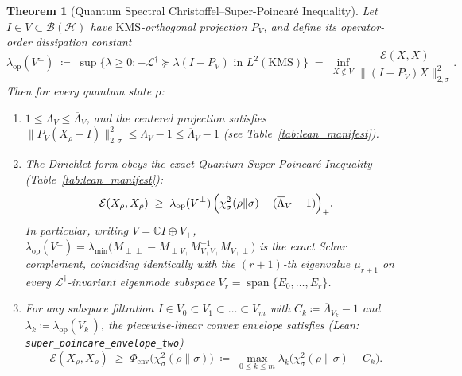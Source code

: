 \documentclass[11pt,a4paper]{article}
\newtheorem{theorem}{Theorem}[section]
\theoremstyle{definition}
\newcommand{\C}{\mathbb{C}}
\newcommand{\Edir}{\mathcal{E}}
\newcommand{\KMS}{\mathrm{KMS}}
\begin{document}
\begin{theorem}[Quantum Spectral Christoffel--Super-Poincar\'e Inequality]
\label{thm:christoffel_sp}
Let $I \in V \subset \mathcal{B}(\mathcal{H})$ have $\KMS$-orthogonal projection $P_V$, and define its \emph{operator-order dissipation constant}
\[
  \lambda_{\mathrm{op}}(V^\perp) \;\coloneqq\;
  \sup\bigl\{\lambda \ge 0 : -\mathcal{L}^\dagger \succeq \lambda(I - P_V) \text{ in } L^2(\KMS)\bigr\}
  \;=\; \inf_{X \notin V} \frac{\Edir(X, X)}{\|(I - P_V) X\|_{2,\sigma}^2}.
\]
Then for \emph{every} quantum state $\rho$:
\begin{enumerate}[label=(\alph*),leftmargin=2em,itemsep=2pt]
  \item $1 \le \Lambda_V \le \overline{\Lambda}_V$, and the centered projection satisfies $\|P_V(X_\rho - I)\|_{2,\sigma}^2 \le \Lambda_V - 1 \le \overline{\Lambda}_V - 1$ (see Table~\ref{tab:lean_manifest}).
  \item The Dirichlet form obeys the exact Quantum Super-Poincar\'e Inequality (Table~\ref{tab:lean_manifest}):
  \begin{equation}
    \Edir(X_\rho, X_\rho) \;\ge\; \lambda_{\mathrm{op}}(V^\perp)\,\Bigl(\chi^2_\sigma(\rho\|\sigma) - (\overline{\Lambda}_V - 1)\Bigr)_+.
    \label{eq:single_sp}
  \end{equation}
  In particular, writing $V = \C I \oplus V_+$, $\lambda_{\mathrm{op}}(V^\perp) = \lambda_{\min}\bigl(M_{\perp\perp} - M_{\perp V_+} M_{V_+ V_+}^{-1} M_{V_+ \perp}\bigr)$ is the exact Schur complement, coinciding identically with the $(r+1)$-th eigenvalue $\mu_{r+1}$ on every $\mathcal{L}^\dagger$-invariant eigenmode subspace $V_r = \operatorname{span}\{E_0, \dots, E_r\}$.
  \item For any subspace filtration $I \in V_0 \subset V_1 \subset \dots \subset V_m$ with $C_k \coloneqq \overline{\Lambda}_{V_k} - 1$ and $\lambda_k \coloneqq \lambda_{\mathrm{op}}(V_k^\perp)$, the piecewise-linear convex envelope satisfies (Lean: \texttt{super\_poincare\_envelope\_two})
  \begin{equation}
    \Edir(X_\rho, X_\rho) \;\ge\; \Phi_{\mathrm{env}}\bigl(\chi^2_\sigma(\rho\|\sigma)\bigr)
    \;\coloneqq\; \max_{0 \le k \le m} \lambda_k \bigl(\chi^2_\sigma(\rho\|\sigma) - C_k\bigr).
    \label{eq:envelope_sp}
  \end{equation}
\end{enumerate}
\end{theorem}
\end{document}
